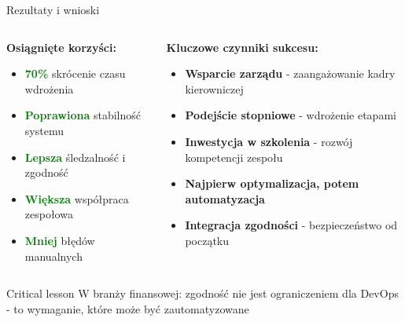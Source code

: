 \documentclass[10pt, aspectratio=169]{beamer}
\begin{document}
\begin{frame}{Rezultaty i wnioski}
\begin{columns}[T]
\begin{column}{0.5\textwidth}
\textbf{Osiągnięte korzyści:}
\begin{itemize}
\item \textcolor{green}{\textbf{70\%}} skrócenie czasu wdrożenia
\item \textcolor{green}{\textbf{Poprawiona}} stabilność systemu
\item \textcolor{green}{\textbf{Lepsza}} śledzalność i zgodność
\item \textcolor{green}{\textbf{Większa}} współpraca zespołowa
\item \textcolor{green}{\textbf{Mniej}} błędów manualnych
\end{itemize}
\end{column}
\begin{column}{0.5\textwidth}
\textbf{Kluczowe czynniki sukcesu:}
\begin{itemize}
\item \textbf{Wsparcie zarządu} - zaangażowanie kadry kierowniczej
\item \textbf{Podejście stopniowe} - wdrożenie etapami
\item \textbf{Inwestycja w szkolenia} - rozwój kompetencji zespołu
\item \textbf{Najpierw optymalizacja, potem automatyzacja}
\item \textbf{Integracja zgodności} - bezpieczeństwo od początku
\end{itemize}
\end{column}
\end{columns}

\begin{alertblock}{Critical lesson}
W branży finansowej: zgodność nie jest ograniczeniem dla DevOps - to wymaganie, które może być zautomatyzowane
\end{alertblock}
\end{frame}
\end{document}
